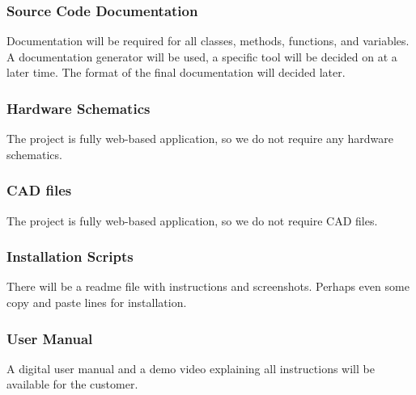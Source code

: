 \subsubsection{Source Code Documentation}
Documentation will be required for all classes, methods, functions, and variables. A documentation generator will be used, a specific tool will be decided on at a later time. The format of the final documentation will decided later.

\subsubsection{Hardware Schematics}
The project is fully web-based application, so we do not require any hardware schematics.

\subsubsection{CAD files}
The project is fully web-based application, so we do not require CAD files.

\subsubsection{Installation Scripts}
There will be a readme file with instructions and screenshots. Perhaps even some copy and
    paste lines for installation.

\subsubsection{User Manual}
A digital user manual and a demo video explaining all instructions will be available for the customer.
